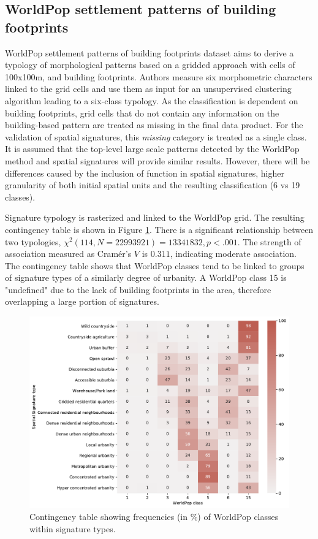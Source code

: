 \subsection*{WorldPop settlement patterns of building footprints}
WorldPop settlement patterns of building footprints dataset aims to derive a typology of
morphological patterns based on a gridded approach with cells of
100x100m, and building footprints. Authors measure six morphometric characters
linked to the grid cells and use them as input for an unsupervised clustering
algorithm leading to a six-class typology.
As the classification is dependent on building footprints, grid cells that do
not contain any information on the building-based pattern are treated as missing in the
final data product. For the validation of spatial signatures, this \textit{missing}
category is treated as a single class. It is assumed that the top-level large scale
patterns detected by the WorldPop method and spatial signatures will provide similar
results. However, there will be differences caused by the inclusion of function in spatial
signatures, higher granularity of both initial spatial units and the resulting
classification (6 vs 19 classes).

Signature typology is rasterized and linked to the WorldPop grid. The resulting
contingency table is shown in Figure \ref{fig:crosstab_worldpop}. There is a significant relationship between
two typologies, $\chi^{2} (114, N = 22993921) = 13341832, p < .001$. The strength of
association measured as Cram\'{e}r's $V$ is $0.311$, indicating moderate association.
The contingency table shows that WorldPop classes tend to be linked to groups of
signature types of a similarly degree of urbanity. A WorldPop class 15 is "undefined" due
to the lack of building footprints in the area, therefore overlapping a large portion of
signatures.

\begin{figure}
    \centering
    \includegraphics[width=.8\linewidth]{fig/crosstab_worldpop.pdf}
    \caption{Contingency table showing frequencies (in \%) of WorldPop classes within signature types.}
    \label{fig:crosstab_worldpop}
\end{figure}

